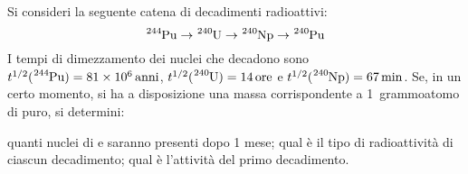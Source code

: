 \begin{Exercise}[title={Catena di decadimenti radioattivi ed equilibrio secolare}]
  Si consideri la seguente catena di decadimenti radioattivi:
  \[
  \ce{^{244}Pu} \to \ce{^{240}U} \to \ce{^{240}Np} \to \ce{^{240}Pu}
  \]
  I tempi di dimezzamento dei nuclei che decadono sono $t^{1/2}(\ce{^{244}Pu})=\SI{81e6}{anni}$,
  $t^{1/2}(\ce{^{240}U})=\SI{14}{ore}$ e $t^{1/2}(\ce{^{240}Np})=\SI{67}{min}$. Se, in un certo momento, si ha a disposizione
  una massa corrispondente a \SI{1}{grammoatomo} di  puro, si determini:

  \Question quanti nuclei di  e   saranno presenti dopo 1 mese;
  \Question qual \`e il tipo di radioattivit\`a di ciascun decadimento;
  \Question qual \`e l'attivit\`a del primo decadimento.
  
\end{Exercise}


